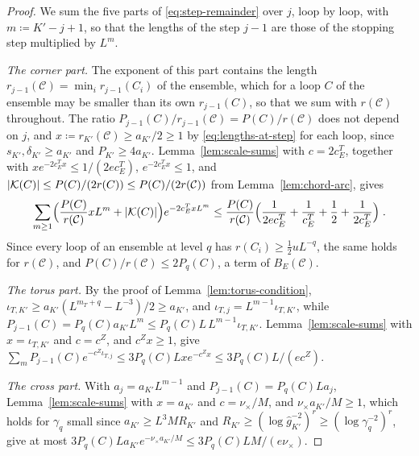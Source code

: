 \documentclass[11pt]{preprint}
\DeclarePairedDelimiter{\abs}{\lvert}{\rvert}
\numberwithin{equation}{section}
\theoremstyle{definition}
\theoremstyle{remark}
\theoremstyle{plain}
\begin{document}
\begin{proof}
We sum the five parts of \eqref{eq:step-remainder} over $j$, loop by loop, with $m \coloneqq K' - j + 1$, so that the lengths of the step $j - 1$ are those of the stopping step multiplied by $L^m$.

\emph{The corner part.} The exponent of this part contains the length $r_{j-1}(\mathcal C) = \min_ir_{j-1}(C_i)$ of the ensemble, which for a loop $C$ of the ensemble may be smaller than its own $r_{j-1}(C)$, so that we sum with $r(\mathcal C)$ throughout. The ratio $P_{j-1}(C)/r_{j-1}(\mathcal C) = P(C)/r(\mathcal C)$ does not depend on $j$, and $x \coloneqq r_{K'}(\mathcal C) \geq a_{K'}/2 \geq 1$ by \eqref{eq:lengths-at-step} for each loop, since $s_{K'}, \delta_{K'} \geq a_{K'}$ and $P_{K'} \geq 4a_{K'}$. Lemma~\ref{lem:scale-sums} with $c = 2c^T_E$, together with $xe^{-2c^T_Ex} \leq 1/(2ec^T_E)$, $e^{-2c^T_Ex} \leq 1$, and $\abs{\mathcal K(C)} \leq P(C)/(2r(C)) \leq P(C)/(2r(\mathcal C))$ from Lemma~\ref{lem:chord-arc}, gives
\begin{equation}\label{eq:corner-part-sum}
    \sum_{m \geq 1}\Bigl(\frac{P(C)}{r(\mathcal C)}xL^m + \abs{\mathcal K(C)}\Bigr)e^{-2c^T_ExL^m} \leq \frac{P(C)}{r(\mathcal C)}\Bigl(\frac{1}{2ec^T_E} + \frac{1}{c^T_E} + \frac12 + \frac{1}{2c^T_E}\Bigr)\;.
\end{equation}
Since every loop of an ensemble at level $q$ has $r(C_i) \geq \frac12uL^{-q}$, the same holds for $r(\mathcal C)$, and $P(C)/r(\mathcal C) \leq 2P_q(C)$, a term of $B_E(\mathcal C)$.

\emph{The torus part.} By the proof of Lemma~\ref{lem:torus-condition}, $\iota_{T,K'} \geq a_{K'}(L^{m_T+q} - L^{-3})/2 \geq a_{K'}$, and $\iota_{T,j} = L^{m-1}\iota_{T,K'}$, while $P_{j-1}(C) = P_q(C)a_{K'}L^m \leq P_q(C)L\,L^{m-1}\iota_{T,K'}$. Lemma~\ref{lem:scale-sums} with $x = \iota_{T,K'}$ and $c = c^Z$, and $c^Zx \geq 1$, give $\sum_mP_{j-1}(C)e^{-c^Z\iota_{T,j}} \leq 3P_q(C)Lxe^{-c^Zx} \leq 3P_q(C)L/(ec^Z)$.

\emph{The cross part.} With $a_j = a_{K'}L^{m-1}$ and $P_{j-1}(C) = P_q(C)La_j$, Lemma~\ref{lem:scale-sums} with $x = a_{K'}$ and $c = \nu_\times/M$, and $\nu_\times a_{K'}/M \geq 1$, which holds for $\gamma_q$ small since $a_{K'} \geq L^3MR_{K'}$ and $R_{K'} \geq (\log\hat g_{K'}^{-2})^r \geq (\log\gamma_q^{-2})^r$, give at most $3P_q(C)La_{K'}e^{-\nu_\times a_{K'}/M} \leq 3P_q(C)LM/(e\nu_\times)$.


\end{proof}
\end{document}
